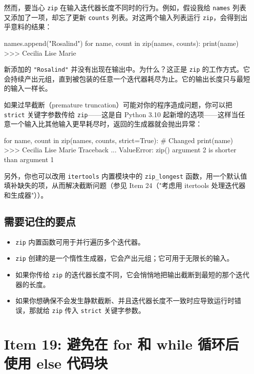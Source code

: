 然而，要当心 \texttt{zip} 在输入迭代器长度不同时的行为。例如，假设我给 \texttt{names} 列表又添加了一项，却忘了更新 \texttt{counts} 列表。对这两个输入列表运行 \texttt{zip}，会得到出乎意料的结果：

\begin{codebox}[python]
names.append("Rosalind")
for name, count in zip(names, counts):
    print(name)
>>>
Cecilia
Lise
Marie
\end{codebox}

新添加的 \texttt{"Rosalind"} 并没有出现在输出中。为什么？这正是 \texttt{zip} 的工作方式。它会持续产出元组，直到被包装的任意一个迭代器耗尽为止。它的输出长度只与最短的输入一样长。

如果过早截断（premature truncation）可能对你的程序造成问题，你可以把 \texttt{strict} 关键字参数传给 \texttt{zip}——这是自 Python 3.10 起新增的选项——这样当任意一个输入比其他输入更早耗尽时，返回的生成器就会抛出异常：

\begin{codebox}[python]
for name, count in zip(names, counts, strict=True):  # Changed
    print(name)
>>>
Cecilia
Lise
Marie
Traceback ...
ValueError: zip() argument 2 is shorter than argument 1
\end{codebox}

另外，你也可以改用 \texttt{itertools} 内置模块中的 \texttt{zip\_longest} 函数，用一个默认值填补缺失的项，从而解决截断问题（参见 Item 24（"考虑用 itertools 处理迭代器和生成器"））。

\subsection{需要记住的要点}
\begin{itemize}
\item \texttt{zip} 内置函数可用于并行遍历多个迭代器。
\item \texttt{zip} 创建的是一个惰性生成器，它会产出元组；它可用于无限长的输入。
\item 如果你传给 \texttt{zip} 的迭代器长度不同，它会悄悄地把输出截断到最短的那个迭代器的长度。
\item 如果你想确保不会发生静默截断、并且迭代器长度不一致时应导致运行时错误，那就给 \texttt{zip} 传入 \texttt{strict} 关键字参数。
\end{itemize}

\section{Item 19: 避免在 for 和 while 循环后使用 else 代码块}

